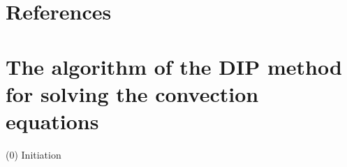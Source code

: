 \documentclass{article}
\theoremstyle{plain}\newtheorem{definition}{\sc{Definition}}
\theoremstyle{defination}\newtheorem{example}{Example}[section]
\numberwithin{equation}{section}
\numberwithin{table}{section}
\begin{document}
\section*{References}



\newpage
  \appendix
  \renewcommand{\appendixname}{Appendix~}

  \section{The algorithm of the DIP method for solving the convection equations}
\large {\color{black!60!red!80!}}
  \color{black}

\hspace{-0.48cm}
\normalsize
(0) Initiation 
\vspace{0.1cm}
\end{document}
